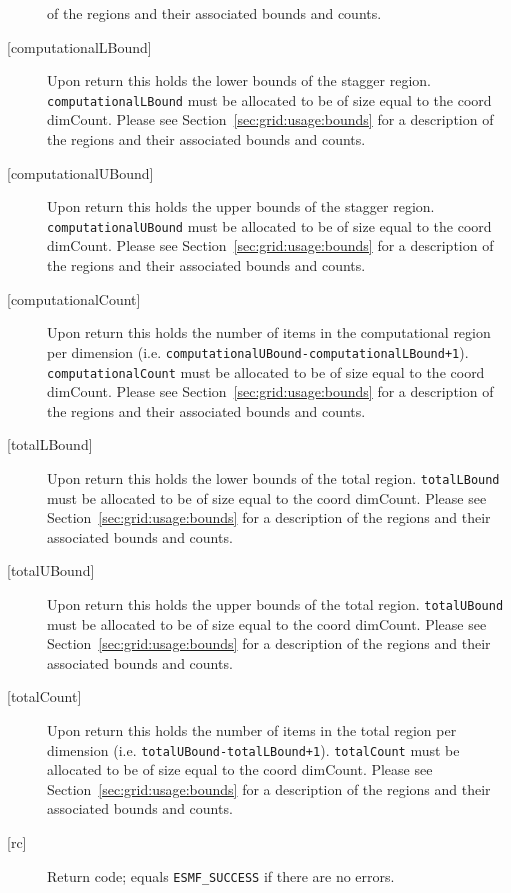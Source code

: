 \begin{description}
       of the regions and their associated bounds and counts.
  \item[{[computationalLBound]}]
       Upon return this holds the lower bounds of the stagger region.
       {\tt computationalLBound} must be allocated to be of size equal to the coord dimCount.
       Please see Section~\ref{sec:grid:usage:bounds} for a description
       of the regions and their associated bounds and counts.
  \item[{[computationalUBound]}]
       Upon return this holds the upper bounds of the stagger region.
       {\tt computationalUBound} must be allocated to be of size equal to the coord dimCount.
       Please see Section~\ref{sec:grid:usage:bounds} for a description
       of the regions and their associated bounds and counts.
  \item[{[computationalCount]}]
       Upon return this holds the number of items in the computational region per dimension
       (i.e. {\tt computationalUBound-computationalLBound+1}). {\tt computationalCount}
        must be allocated to be of size equal to the coord dimCount.
       Please see Section~\ref{sec:grid:usage:bounds} for a description
       of the regions and their associated bounds and counts.
  \item[{[totalLBound]}]
       Upon return this holds the lower bounds of the total region.
       {\tt totalLBound} must be allocated to be of size equal to the coord dimCount.
       Please see Section~\ref{sec:grid:usage:bounds} for a description
       of the regions and their associated bounds and counts.
  \item[{[totalUBound]}]
       Upon return this holds the upper bounds of the total region.
       {\tt totalUBound} must be allocated to be of size equal to the coord dimCount.
       Please see Section~\ref{sec:grid:usage:bounds} for a description
       of the regions and their associated bounds and counts.
  \item[{[totalCount]}]
       \begin{sloppypar}
       Upon return this holds the number of items in the total region per dimension
       (i.e. {\tt totalUBound-totalLBound+1}). {\tt totalCount} must
        be allocated to be of size equal to the coord dimCount.
       Please see Section~\ref{sec:grid:usage:bounds} for a description
       of the regions and their associated bounds and counts.
       \end{sloppypar}
  \item[{[rc]}]
       Return code; equals {\tt ESMF\_SUCCESS} if there are no errors.
  \end{description}
   
